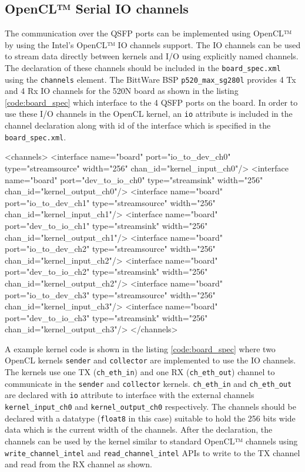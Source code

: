 \subsection{OpenCL™ Serial IO channels}

The communication over the QSFP ports can be implemented using OpenCL™ by using the
Intel's OpenCL™ IO channels support. The IO channels can be used to stream data
directly between kernels and I/O using explicitly named channels. The declaration
of these channels should be included in the \texttt{board\_spec.xml} using the
\texttt{channels} element. The BittWare BSP \texttt{p520\_max\_sg280l} provides
4 Tx and 4 Rx IO channels for the 520N board as shown in the listing \ref{code:board_spec}
which interface to the 4 QSFP ports on the board.
In order to use these I/O channels in the OpenCL kernel,
an \texttt{io} attribute is included in the channel declaration along with id of
the interface which is specified in the \texttt{board\_spec.xml}.

\begin{XmlCode}[caption=IO channels desciption in \texttt{board\_spec.xml}, frame=tlrb, label=code:board_spec]
<channels>
    <interface name="board" port="io_to_dev_ch0" type="streamsource" width="256" chan_id="kernel_input_ch0"/>
    <interface name="board" port="dev_to_io_ch0" type="streamsink" width="256" chan_id="kernel_output_ch0"/>
    <interface name="board" port="io_to_dev_ch1" type="streamsource" width="256" chan_id="kernel_input_ch1"/>
    <interface name="board" port="dev_to_io_ch1" type="streamsink" width="256" chan_id="kernel_output_ch1"/>
    <interface name="board" port="io_to_dev_ch2" type="streamsource" width="256" chan_id="kernel_input_ch2"/>
    <interface name="board" port="dev_to_io_ch2" type="streamsink" width="256" chan_id="kernel_output_ch2"/>
    <interface name="board" port="io_to_dev_ch3" type="streamsource" width="256" chan_id="kernel_input_ch3"/>
    <interface name="board" port="dev_to_io_ch3" type="streamsink" width="256" chan_id="kernel_output_ch3"/>
</channels>
\end{XmlCode}

A example kernel code is shown in the listing \ref{code:board_spec} where two OpenCL
kernels \texttt{sender} and \texttt{collector}
are implemented to use the IO channels. The kernels use one TX (\texttt{ch\_eth\_in})
and one RX (\texttt{ch\_eth\_out}) channel to
communicate in the \texttt{sender} and \texttt{collector} kernels.
\texttt{ch\_eth\_in} and \texttt{ch\_eth\_out} are declared with \texttt{io} attribute
to interface with the external channels \texttt{kernel\_input\_ch0} and \texttt{kernel\_output\_ch0} respectively.
The channels should be declared with a datatype (\texttt{float8} in this case)
suitable to hold the 256 bits wide data which is the current width of the channels.
After the declaration, the channels can be used by the kernel similar to standard OpenCL™
channels using \texttt{write\_channel\_intel} and \texttt{read\_channel\_intel} APIs to write
to the TX channel and read from the RX channel as shown.

